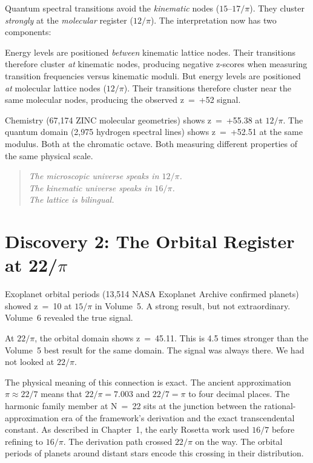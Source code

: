 \documentclass[11pt, letterpaper, openany]{book}
\begin{document}
Quantum spectral transitions avoid the \emph{kinematic} nodes ($15$--$17/\pi$).
They cluster \emph{strongly} at the \emph{molecular} register ($12/\pi$). The interpretation now has two components:

Energy levels are positioned \emph{between} kinematic lattice nodes.
Their transitions therefore cluster \emph{at} kinematic nodes, producing negative z-scores when measuring transition frequencies versus kinematic moduli.
But energy levels are positioned \emph{at} molecular lattice nodes ($12/\pi$).
Their transitions therefore cluster near the same molecular nodes, producing the observed z~=~+52 signal.

Chemistry (67,174 ZINC molecular geometries) shows z~=~+55.38 at $12/\pi$. The quantum domain (2,975 hydrogen spectral lines) shows z~=~+52.51 at the same modulus.
Both at the chromatic octave. Both measuring different properties of the same physical scale.

\begin{quote}
\textit{The microscopic universe speaks in $12/\pi$.\\
The kinematic universe speaks in $16/\pi$.\\
The lattice is bilingual.}
\end{quote}

\section*{Discovery 2: The Orbital Register at 22/$\pi$}

Exoplanet orbital periods (13,514 NASA Exoplanet Archive confirmed planets) showed z~=~10 at $15/\pi$ in Volume~5.
A strong result, but not extraordinary. Volume~6 revealed the true signal.

At $22/\pi$, the orbital domain shows z~=~45.11.
This is 4.5 times stronger than the Volume~5 best result for the same domain. The signal was always there.
We had not looked at $22/\pi$.

The physical meaning of this connection is exact.
The ancient approximation $\pi \approx 22/7$ means that $22/\pi = 7.003$ and $22/7 = \pi$ to four decimal places.
The harmonic family member at N~=~22 sits at the junction between the rational-approximation era of the framework's derivation and the exact transcendental constant.
As described in Chapter~1, the early Rosetta work used $16/7$ before refining to $16/\pi$. The derivation path crossed $22/\pi$ on the way.
The orbital periods of planets around distant stars encode this crossing in their distribution.
\end{document}

